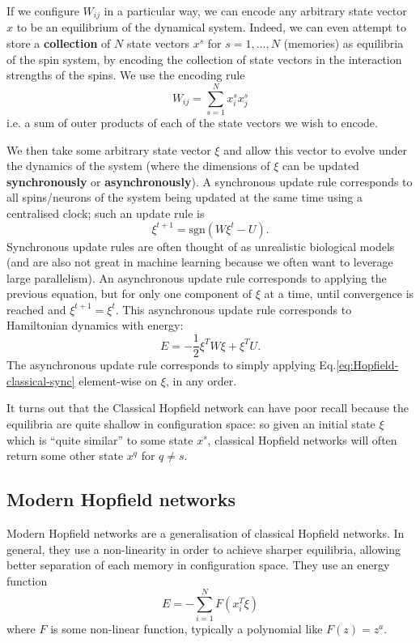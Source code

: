\documentclass[11pt]{article}
\numberwithin{equation}{section}
\begin{document}
If we configure $W_{ij}$ in a particular way, we can encode any arbitrary state vector $x$ to be an equilibrium of the dynamical system. Indeed, we can even attempt to store a \textbf{collection} of $N$ state vectors $x^s$ for $s=1,...,N$ (memories) as equilibria of the spin system, by encoding the collection of state vectors in the interaction strengths of the spins. We use the encoding rule
$$W_{ij} = \sum_{s=1}^N x_i^s x_j^s$$
i.e. a sum of outer products of each of the state vectors we wish to encode.

We then take some arbitrary state vector $\xi$ and allow this vector to evolve under the dynamics of the system (where the dimensions of $\xi$ can be updated \textbf{synchronously} or \textbf{asynchronously}). A synchronous update rule corresponds to all  spins/neurons of the system being updated at the same time using a centralised clock; such an update rule is
\begin{equation}
\xi^{t+1} = \text{sgn}(W \xi^t - U). \label{eq:Hopfield-classical-sync}
\end{equation}
Synchronous update rules are often thought of as unrealistic biological models (and are also not great in machine learning because we often want to leverage large parallelism). An asynchronous update rule corresponds to applying the previous equation, but for only one component of $\xi$ at a time, until convergence is reached and $\xi^{t+1} = \xi^t$. This asynchronous update rule corresponds to Hamiltonian dynamics with energy:
$$E=-\frac{1}{2} \xi^T W \xi + \xi^T U.$$
The asynchronous update rule corresponds to simply applying Eq.\eqref{eq:Hopfield-classical-sync} element-wise on $\xi$, in any order.

It turns out that the Classical Hopfield network can have poor recall because the equilibria are quite shallow in configuration space: so given an initial state $\xi$ which is ``quite similar'' to some state $x^s$, classical Hopfield networks will often return some other state $x^q$ for $q \neq s$. 

\subsection{Modern Hopfield networks}
Modern Hopfield networks \citep{Krotov16} are a generalisation of classical Hopfield networks. In general, they use a non-linearity in order to achieve sharper equilibria, allowing better separation of each memory in configuration space. They use an energy function
\begin{equation}
E = - \sum_{i=1}^N F(x_i^T \xi)
\end{equation} 
where $F$ is some non-linear function, typically a polynomial like $F(z) = z^a$. 
\end{document}
